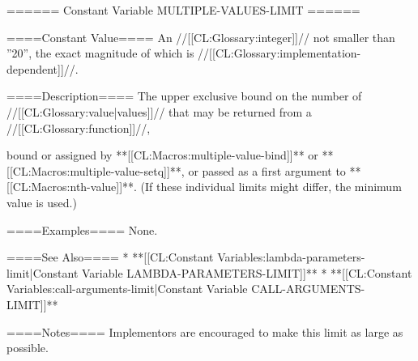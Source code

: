 ====== Constant Variable MULTIPLE-VALUES-LIMIT ======

====Constant Value====
An //[[CL:Glossary:integer]]// not smaller than ''20'', the exact magnitude of which is //[[CL:Glossary:implementation-dependent]]//.

====Description====
The upper exclusive bound on the number of //[[CL:Glossary:value|values]]// that may be returned from a //[[CL:Glossary:function]]//,

bound or assigned by **[[CL:Macros:multiple-value-bind]]** or **[[CL:Macros:multiple-value-setq]]**, or passed as a first argument to **[[CL:Macros:nth-value]]**. (If these individual limits might differ, the minimum value is used.)

====Examples====
None.

====See Also====
  * **[[CL:Constant Variables:lambda-parameters-limit|Constant Variable LAMBDA-PARAMETERS-LIMIT]]**
  * **[[CL:Constant Variables:call-arguments-limit|Constant Variable CALL-ARGUMENTS-LIMIT]]**

====Notes====
Implementors are encouraged to make this limit as large as possible.

